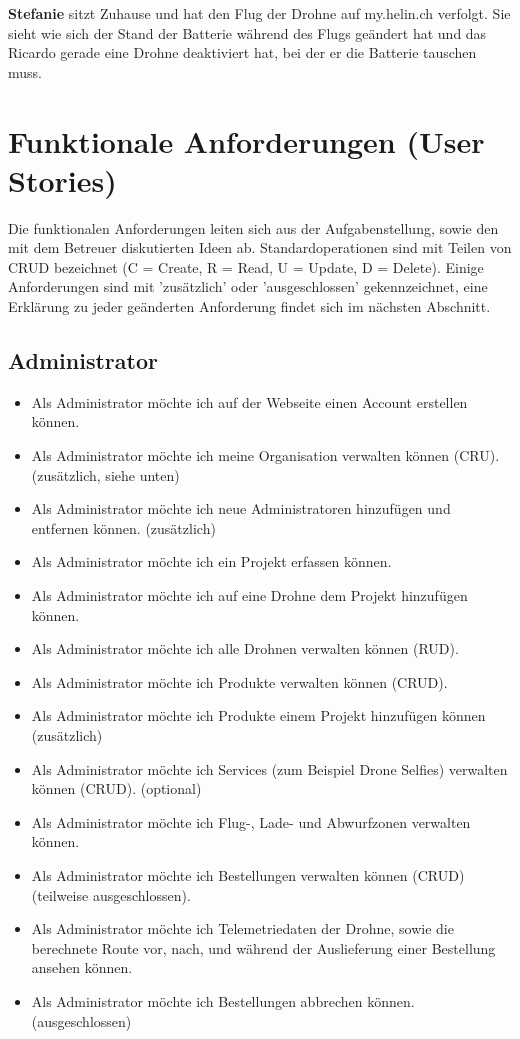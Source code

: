 \textbf{Stefanie} sitzt Zuhause und hat den Flug der Drohne auf my.helin.ch verfolgt. Sie sieht wie sich der Stand der Batterie während des Flugs geändert hat und das Ricardo gerade eine Drohne deaktiviert hat, bei der er die Batterie tauschen muss.

\newpage
\section{Funktionale Anforderungen (User Stories)}

Die funktionalen Anforderungen leiten sich aus der Aufgabenstellung, sowie den mit dem Betreuer diskutierten Ideen ab. Standardoperationen sind mit Teilen von CRUD bezeichnet (C = Create, R = Read, U = Update, D = Delete). Einige Anforderungen sind mit 'zusätzlich' oder 'ausgeschlossen' gekennzeichnet, eine Erklärung zu jeder geänderten Anforderung findet sich im nächsten Abschnitt.

\subsection{Administrator}
\begin{itemize}
\item Als Administrator möchte ich auf der Webseite einen Account erstellen können.
\item Als Administrator möchte ich meine Organisation verwalten können (CRU). (zusätzlich, siehe unten)
\item Als Administrator möchte ich neue Administratoren hinzufügen und entfernen können. (zusätzlich)
\item Als Administrator möchte ich ein Projekt erfassen können.
\item Als Administrator möchte ich auf eine Drohne dem Projekt hinzufügen können.
\item Als Administrator möchte ich alle Drohnen verwalten können (RUD).
\item Als Administrator möchte ich Produkte verwalten können (CRUD).
\item Als Administrator möchte ich Produkte einem Projekt hinzufügen können (zusätzlich)
\item Als Administrator möchte ich Services (zum Beispiel Drone Selfies) verwalten können (CRUD). (optional)
\item Als Administrator möchte ich Flug-, Lade- und Abwurfzonen verwalten können.
\item Als Administrator möchte ich Bestellungen verwalten können (CRUD) (teilweise ausgeschlossen).
\item Als Administrator möchte ich Telemetriedaten der Drohne, sowie die berechnete Route vor, nach, und während der Auslieferung einer Bestellung ansehen können.
\item Als Administrator möchte ich Bestellungen abbrechen können. (ausgeschlossen)
\end{itemize}

